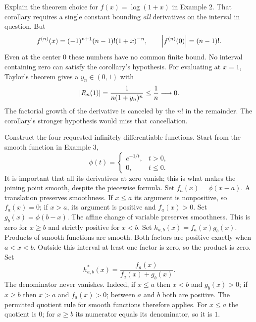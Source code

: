 \goal Explain the theorem choice for $f(x)=\log(1+x)$ in Example 2.
That corollary requires a single constant bounding \emph{all} derivatives
on the interval in question. But
\[
 f^{(n)}(x)=(-1)^{n+1}(n-1)!(1+x)^{-n},\qquad
 \left|f^{(n)}(0)\right|=(n-1)!.
\]
Even at the center $0$ these numbers have no common finite bound.
No interval containing zero can satisfy the corollary's hypothesis.
For evaluating at $x=1$, Taylor's theorem gives a $y_n\in(0,1)$ with
\[
 \left|R_n(1)\right|=\frac1{n(1+y_n)^n}\le\frac1n\longrightarrow0.
\]
The factorial growth of the derivative is canceled by the $n!$ in the
remainder. The corollary's stronger hypothesis would miss that cancellation.

\goal Construct the four requested infinitely differentiable functions.
\idea Start from the smooth function in Example 3,
\[
 \phi(t)=\begin{cases}e^{-1/t},&t>0,\\0,&t\le0.\end{cases}
\]
It is important that all its derivatives at zero vanish; this is what makes
the joining point smooth, despite the piecewise formula.
Set $f_a(x)=\phi(x-a)$. A translation preserves smoothness.
If $x\le a$ its argument is nonpositive, so $f_a(x)=0$; if $x>a$,
its argument is positive and $f_a(x)>0$.
Set $g_b(x)=\phi(b-x)$. The affine change of variable preserves smoothness.
This is zero for $x\ge b$ and strictly positive for $x<b$.
Set $h_{a,b}(x)=f_a(x)g_b(x)$. Products of smooth functions are smooth.
Both factors are positive exactly when $a<x<b$. Outside this interval
at least one factor is zero, so the product is zero.
Set
\[
 h^*_{a,b}(x)=\frac{f_a(x)}{f_a(x)+g_b(x)}.
\]
The denominator never vanishes. Indeed, if $x\le a$ then $x<b$ and
$g_b(x)>0$; if $x\ge b$ then $x>a$ and $f_a(x)>0$; between $a$ and
$b$ both are positive. The permitted quotient rule for smooth functions
therefore applies. For $x\le a$ the quotient is $0$; for $x\ge b$
its numerator equals its denominator, so it is $1$.


